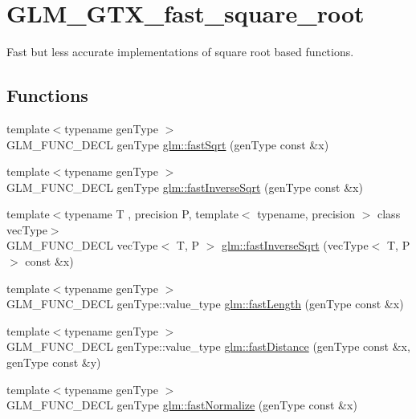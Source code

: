 \hypertarget{group__gtx__fast__square__root}{\section{G\-L\-M\-\_\-\-G\-T\-X\-\_\-fast\-\_\-square\-\_\-root}
\label{group__gtx__fast__square__root}
}


Fast but less accurate implementations of square root based functions.  


\subsection*{Functions}
\begin{DoxyCompactItemize}
\item 
{\footnotesize template$<$typename gen\-Type $>$ }\\G\-L\-M\-\_\-\-F\-U\-N\-C\-\_\-\-D\-E\-C\-L gen\-Type \hyperlink{group__gtx__fast__square__root_gab07ddede2731f3438d687a652c843673}{glm\-::fast\-Sqrt} (gen\-Type const \&x)
\item 
{\footnotesize template$<$typename gen\-Type $>$ }\\G\-L\-M\-\_\-\-F\-U\-N\-C\-\_\-\-D\-E\-C\-L gen\-Type \hyperlink{group__gtx__fast__square__root_ga65237d716748c6262f316ec1eaf7f073}{glm\-::fast\-Inverse\-Sqrt} (gen\-Type const \&x)
\item 
{\footnotesize template$<$typename T , precision P, template$<$ typename, precision $>$ class vec\-Type$>$ }\\G\-L\-M\-\_\-\-F\-U\-N\-C\-\_\-\-D\-E\-C\-L vec\-Type$<$ T, P $>$ \hyperlink{group__gtx__fast__square__root_ga903878071f92e51e551791e584a171a1}{glm\-::fast\-Inverse\-Sqrt} (vec\-Type$<$ T, P $>$ const \&x)
\item 
{\footnotesize template$<$typename gen\-Type $>$ }\\G\-L\-M\-\_\-\-F\-U\-N\-C\-\_\-\-D\-E\-C\-L gen\-Type\-::value\-\_\-type \hyperlink{group__gtx__fast__square__root_ga70aa3c80d8bb22e021c6c3ebdcf8e3ee}{glm\-::fast\-Length} (gen\-Type const \&x)
\item 
{\footnotesize template$<$typename gen\-Type $>$ }\\G\-L\-M\-\_\-\-F\-U\-N\-C\-\_\-\-D\-E\-C\-L gen\-Type\-::value\-\_\-type \hyperlink{group__gtx__fast__square__root_ga69778792fcadc29f586efa3ec2118cdc}{glm\-::fast\-Distance} (gen\-Type const \&x, gen\-Type const \&y)
\item 
{\footnotesize template$<$typename gen\-Type $>$ }\\G\-L\-M\-\_\-\-F\-U\-N\-C\-\_\-\-D\-E\-C\-L gen\-Type \hyperlink{group__gtx__fast__square__root_ga3b02c1d6e0c754144e2f1e110bf9f16c}{glm\-::fast\-Normalize} (gen\-Type const \&x)
\end{DoxyCompactItemize}


